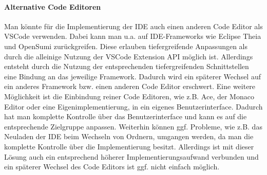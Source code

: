\paragraph{Alternative Code Editoren} Man könnte für die Implementierung der IDE auch einen anderen Code Editor als \ac{VSCode} verwenden. Dabei kann man u.a. auf IDE-Frameworks wie Eclipse Theia und OpenSumi zurückgreifen. Diese erlauben tiefergreifende Anpassungen als durch die alleinige Nutzung der VSCode Extension API möglich ist. Allerdings entsteht durch die Nutzung der entsprechenden tiefergreifenden Schnittstellen eine Bindung an das jeweilige Framework. Dadurch wird ein späterer Wechsel auf ein anderes Framework bzw. einen anderen Code Editor erschwert. Eine weitere Möglichkeit ist die Einbindung reiner Code Editoren, wie z.B. Ace, der Monaco Editor oder eine Eigenimplementierung, in ein eigenes Benutzerinterface. Dadurch hat man komplette Kontrolle über das Benutzerinterface und kann es auf die entsprechende Zielgruppe anpassen. Weiterhin können ggf. Probleme, wie z.B. das Neuladen der IDE beim Wechseln von Ordnern, umgangen werden, da man die komplette Kontrolle über die Implementierung besitzt. Allerdings ist mit dieser Lösung auch ein entsprechend höherer Implementierungsaufwand verbunden und ein späterer Wechsel des Code Editors ist ggf. nicht einfach möglich.

